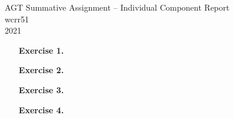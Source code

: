 \documentclass{article}
\begin{document}
	\begin{center}
		\LARGE{AGT Summative Assignment -- Individual Component Report}\\[0.1cm]
		\Large{wcrr51}\\[0.1cm]
		2021\\[0.5cm]
	\end{center}

	\begin{enumerate}

		\item[\textbf{Exercise 1.}]   %
		
		\pagebreak


		\item[\textbf{Exercise 2.}]   %
		
		\pagebreak


		\item[\textbf{Exercise 3.}]   %
		
		\pagebreak


		\item[\textbf{Exercise 4.}]   %
		

	\end{enumerate}
\end{document}
